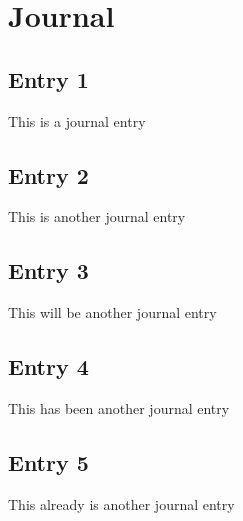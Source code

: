 \section{Journal}

\subsection{Entry 1}
This is a journal entry\autocite{huang_2013_malemale}
\subsection{Entry 2}
This is another journal entry\autocite{huang_2013_malemale}
\subsection{Entry 3}
This will be another journal entry\autocite{loos_2009_transnational}
\subsection{Entry 4}
This has been another journal entry\autocite{manuel_2020_how}
\subsection{Entry 5}
This already is another journal entry\autocite{huang_2013_malemale}
